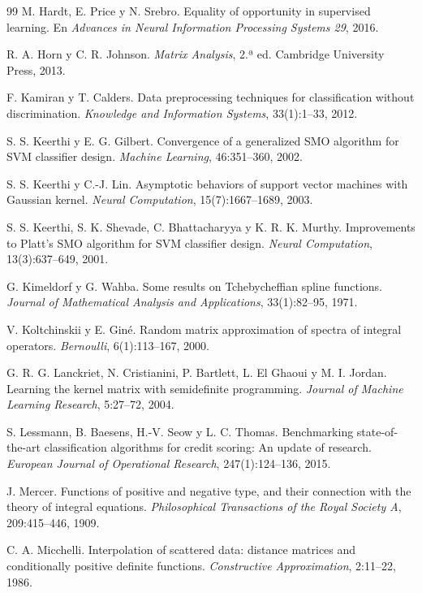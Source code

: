 \documentclass[11pt,a4paper]{article}
\theoremstyle{plain}
\theoremstyle{definition}
\theoremstyle{remark}
\numberwithin{equation}{section}
\begin{document}
\begin{thebibliography}{99}
 M. Hardt, E. Price y N. Srebro. Equality of opportunity in supervised
  learning. En \emph{Advances in Neural Information Processing Systems 29}, 2016.

 R. A. Horn y C. R. Johnson. \emph{Matrix Analysis}, 2.ª ed.
  Cambridge University Press, 2013.

 F. Kamiran y T. Calders. Data preprocessing techniques for
  classification without discrimination. \emph{Knowledge and Information Systems},
  33(1):1--33, 2012.

 S. S. Keerthi y E. G. Gilbert. Convergence of a generalized SMO
  algorithm for SVM classifier design. \emph{Machine Learning}, 46:351--360, 2002.

 S. S. Keerthi y C.-J. Lin. Asymptotic behaviors of support vector
  machines with Gaussian kernel. \emph{Neural Computation}, 15(7):1667--1689, 2003.

 S. S. Keerthi, S. K. Shevade, C. Bhattacharyya y K. R. K. Murthy.
  Improvements to Platt's SMO algorithm for SVM classifier design.
  \emph{Neural Computation}, 13(3):637--649, 2001.

 G. Kimeldorf y G. Wahba. Some results on Tchebycheffian spline
  functions. \emph{Journal of Mathematical Analysis and Applications}, 33(1):82--95, 1971.

 V. Koltchinskii y E. Giné. Random matrix approximation of spectra
  of integral operators. \emph{Bernoulli}, 6(1):113--167, 2000.

 G. R. G. Lanckriet, N. Cristianini, P. Bartlett, L. El Ghaoui y
  M. I. Jordan. Learning the kernel matrix with semidefinite programming.
  \emph{Journal of Machine Learning Research}, 5:27--72, 2004.

 S. Lessmann, B. Baesens, H.-V. Seow y L. C. Thomas. Benchmarking
  state-of-the-art classification algorithms for credit scoring: An update of research.
  \emph{European Journal of Operational Research}, 247(1):124--136, 2015.

 J. Mercer. Functions of positive and negative type, and their connection
  with the theory of integral equations.
  \emph{Philosophical Transactions of the Royal Society A}, 209:415--446, 1909.

 C. A. Micchelli. Interpolation of scattered data: distance matrices
  and conditionally positive definite functions. \emph{Constructive Approximation},
  2:11--22, 1986.


\end{thebibliography}
\end{document}

